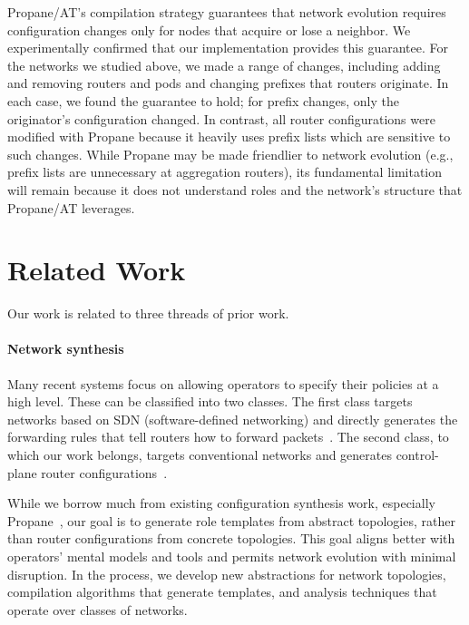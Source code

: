 \documentclass[numbers, 10pt, preprint]{sigplanconf}
\newcommand{\sysname}{{\text{}\small \sf Propane/AT}\xspace}
\newcommand{\Propane}{{\text{}\small \sf Propane}\xspace}
\newcommand{\para}[1]{\paragraph*{\textbf{#1}}}
\begin{document}
\sysname's compilation strategy guarantees that network evolution requires configuration changes only for nodes that acquire or lose a neighbor. We experimentally confirmed that our implementation provides this guarantee. For the networks we studied above, we made a range of changes, including adding and removing routers and pods and changing prefixes that routers originate. In each case, we found the guarantee to hold; for prefix changes, only the originator's configuration changed. In contrast, all router configurations were modified with \Propane because it heavily uses prefix lists which are sensitive to such changes. While \Propane may be made friendlier to network evolution (e.g., prefix lists are unnecessary at aggregation routers), its fundamental limitation will remain because it does not understand roles and the network's structure that \sysname leverages.



%
%
%
%

\section{Related Work}
\label{sec:related}

Our work is related to three threads of prior work.

\para{Network synthesis} Many recent systems focus on allowing operators to specify their policies at a high level. These can be classified into two classes. The first class targets networks based on SDN (software-defined networking) and directly generates the forwarding rules that tell routers how to forward packets~\cite{foster:merlin,fattire,netgen}. The second class, to which our work belongs, targets conventional networks and generates control-plane router configurations~\cite{synet-synthesis,narain+:configassure,propane}.

While we borrow much from existing configuration synthesis work, especially \Propane~\cite{propane}, our goal is to generate role templates from abstract topologies, rather than router configurations from concrete topologies.
This goal aligns better with operators' mental models and tools and permits network evolution with minimal disruption. In the process, we develop new abstractions for network topologies, compilation algorithms that generate templates, and analysis techniques that operate over classes of networks.
\end{document}
